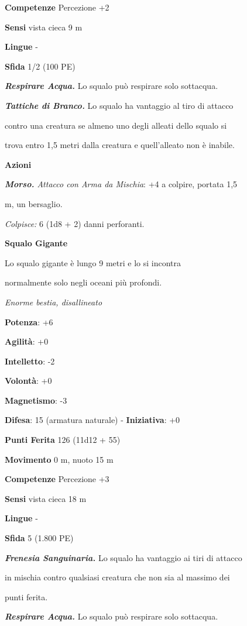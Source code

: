 \begin{multicols}{2}
\textbf{Competenze} Percezione +2

\textbf{Sensi} vista cieca 9 m

\textbf{Lingue} -

\textbf{Sfida} 1/2 (100 PE)\smallskip

\emph{\textbf{Respirare Acqua.}} Lo squalo può respirare solo sottacqua.

\emph{\textbf{Tattiche di Branco.}} Lo squalo ha vantaggio al tiro di
attacco

contro una creatura se almeno uno degli alleati dello squalo si

trova entro 1,5 metri dalla creatura e quell'alleato non è inabile.

\smallskip\textbf{Azioni}

\emph{\textbf{Morso.} Attacco con Arma da Mischia}: +4 a colpire,
portata 1,5

m, un bersaglio.

\emph{Colpisce:} 6 (1d8 + 2) danni perforanti.

\textbf{Squalo Gigante}

Lo squalo gigante è lungo 9 metri e lo si incontra

normalmente solo negli oceani più profondi.

\emph{Enorme bestia, disallineato}

\textbf{Potenza}: +6

\textbf{Agilità}: +0

\textbf{Intelletto}: -2

\textbf{Volontà}: +0

\textbf{Magnetismo}: -3

\textbf{Difesa}: 15 (armatura naturale) - \textbf{Iniziativa}: +0

\textbf{Punti Ferita} 126 (11d12 + 55)

\textbf{Movimento} 0 m, nuoto 15 m

\textbf{Competenze} Percezione +3

\textbf{Sensi} vista cieca 18 m

\textbf{Lingue} -

\textbf{Sfida} 5 (1.800 PE)\smallskip

\emph{\textbf{Frenesia Sanguinaria.}} Lo squalo ha vantaggio ai tiri di
attacco

in mischia contro qualsiasi creatura che non sia al massimo dei

punti ferita.

\emph{\textbf{Respirare Acqua.}} Lo squalo può respirare solo sottacqua.


\end{multicols}
